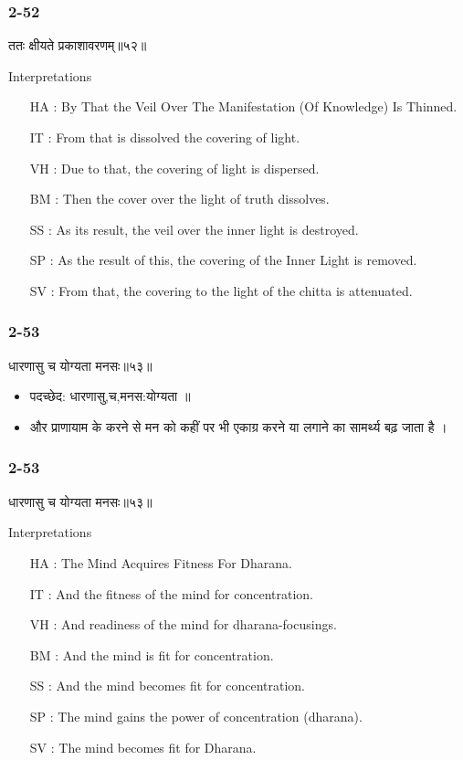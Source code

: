 \begin{frame}[fragile]\frametitle{2-52}
\begin{sanskrit}
ततः क्षीयते प्रकाशावरणम्॥५२॥
\end{sanskrit}

Interpretations
\begin{itemize}
\item [HA]: By That the Veil Over The Manifestation (Of Knowledge) Is Thinned.
\item [IT]: From that is dissolved the covering of light.
\item [VH]: Due to that, the covering of light is dispersed.
\item [BM]: Then the cover over the light of truth dissolves.
\item [SS]: As its result, the veil over the inner light is destroyed.
\item [SP]: As the result of this, the covering of the Inner Light is removed.
\item [SV]: From that, the covering to the light of the chitta is attenuated. 
\end{itemize}
		
\end{frame}

\begin{frame}[fragile]\frametitle{2-53}
\begin{sanskrit}
धारणासु च योग्यता मनसः॥५३॥
\end{sanskrit}

\begin{itemize}
\item पदच्छेद: धारणासु,च,मनस:योग्यता ॥
\item और प्राणायाम के करने से मन को कहीं पर भी एकाग्र करने या लगाने का सामर्थ्य बढ़ जाता है ।
\end{itemize}
	
\end{frame}

\begin{frame}[fragile]\frametitle{2-53}
\begin{sanskrit}
धारणासु च योग्यता मनसः॥५३॥
\end{sanskrit}

Interpretations
\begin{itemize}
\item [HA]: The Mind Acquires Fitness For Dharana.
\item [IT]: And the fitness of the mind for concentration.
\item [VH]: And readiness of the mind for dharana-focusings.
\item [BM]: And the mind is fit for concentration.
\item [SS]: And the mind becomes fit for concentration.
\item [SP]: The mind gains the power of concentration (dharana).
\item [SV]: The mind becomes fit for Dharana. 
\end{itemize}
\end{frame}

